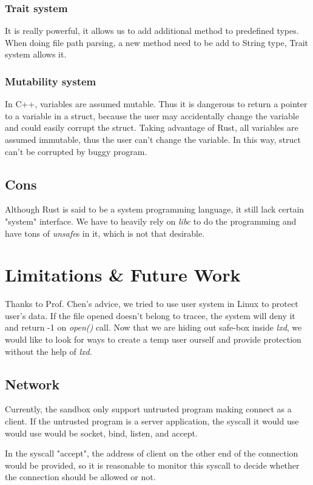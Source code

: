 \documentclass[conference,compsoc]{IEEEtran}
\begin{document}
			\subsubsection{Trait system} 
				It is really powerful, it allows us to add additional method to predefined types. 
				When doing file path parsing, a new method need to be add to String type, Trait system allows it.
			\subsubsection{Mutability system} 
				In C++, variables are assumed mutable. 
				Thus it is dangerous to return a pointer to a variable in a struct, because the user may accidentally change the variable and could easily corrupt the struct.
				Taking advantage of Rust, all variables are assumed immutable, thus the user can't change the variable. 
				In this way, struct can't be corrupted by buggy program.
	\subsection{Cons}
		\par %
			Although Rust is said to be a system programming language, it still lack certain "system" interface.
			We have to heavily rely on \emph{libc} to do the programming and have tons of \emph{unsafe}s in it, which is not that desirable. 				

\section{Limitations \& Future Work}
		\par
			Thanks to Prof. Chen's advice, we tried to use user system in Linux to protect user's data. 
			If the file opened doesn't belong to tracee, the system will deny it and return -1 on \emph{open()} call.
			Now that we are hiding out safe-box inside \emph{lxd}, we would like to look for ways to create a temp user ourself and provide protection without the help of \emph{lxd}.
	\subsection{Network}
		\par
			Currently, the sandbox only support untrusted program making connect as a client. 
			If the untrusted program is a server application, the syscall it would use would use would be socket, bind, listen, and accept. 
		\par
			In the syscall "accept", the address of client on the other end of the connection would be provided, so it is reasonable to monitor this syscall to decide whether the connection should be allowed or not.
\end{document}
